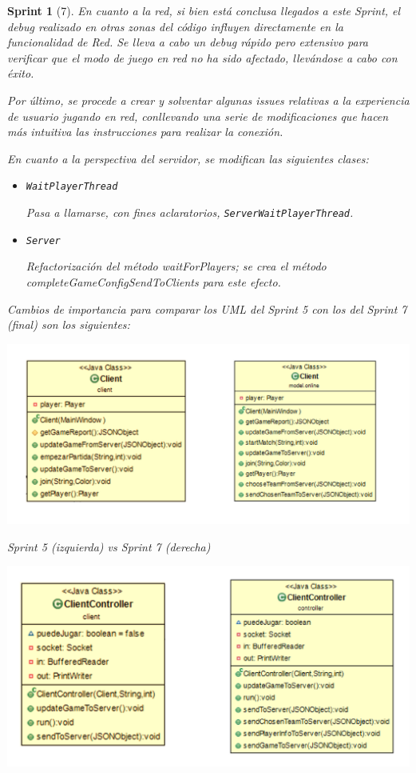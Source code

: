\documentclass[12pt,a4paper,openright]{book}
\theoremstyle{break}
\newtheorem*{sprint}{Sprint}
\begin{document}
\begin{sprint}[7]

En cuanto a la red, si bien está conclusa llegados a este Sprint, el debug realizado en otras zonas del código influyen directamente en la funcionalidad de Red. Se lleva a cabo un debug rápido pero extensivo para verificar que el modo de juego en red no ha sido afectado, llevándose a cabo con éxito.

Por último, se procede a crear y solventar algunas issues relativas a la experiencia de usuario jugando en red, conllevando una serie de modificaciones que hacen más intuitiva las instrucciones para realizar la conexión.

En cuanto a la perspectiva del servidor, se modifican las siguientes clases:

\begin{itemize}

\item \texttt{WaitPlayerThread}

Pasa a llamarse, con fines aclaratorios, \texttt{ServerWaitPlayerThread}.

\item \texttt{Server}

Refactorización del método waitForPlayers; se crea el método completeGameConfigSendToClients para este efecto.

\end{itemize}

Cambios de importancia para comparar los UML del Sprint 5 con los del Sprint 7 (final) son los siguientes:

\begin{center}
\includegraphics[scale=0.3]{Client-evol.png}

Sprint 5 (izquierda) vs Sprint 7 (derecha)
\end{center}

\begin{center}
\includegraphics[scale=0.3]{ClientController-evol.png} 


\end{center}
\end{sprint}
\end{document}
